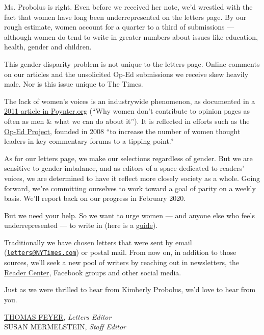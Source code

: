 Ms. Probolus is right. Even before we received her note, we'd wrestled
with the fact that women have long been underrepresented on the letters
page. By our rough estimate, women account for a quarter to a third of
submissions --- although women do tend to write in greater numbers about
issues like education, health, gender and children.

This gender disparity problem is not unique to the letters page. Online
comments on our articles and the unsolicited Op-Ed submissions we
receive skew heavily male. Nor is this issue unique to The Times.

The lack of women's voices is an industrywide phenomenon, as documented
in a
\href{https://www.poynter.org/reporting-editing/2011/why-women-dont-contribute-to-opinion-pages-as-often-as-men-what-we-can-do-about-it/}{2011
article in Poynter.org} (``Why women don't contribute to opinion pages
as often as men \& what we can do about it''). It is reflected in
efforts such as the \href{https://www.theopedproject.org/}{Op-Ed
Project}, founded in 2008 ``to increase the number of women thought
leaders in key commentary forums to a tipping point.''

As for our letters page, we make our selections regardless of gender.
But we are sensitive to gender imbalance, and as editors of a space
dedicated to readers' voices, we are determined to have it reflect more
closely society as a whole. Going forward, we're committing ourselves to
work toward a goal of parity on a weekly basis. We'll report back on our
progress in February 2020.

But we need your help. So we want to urge women --- and anyone else who
feels underrepresented --- to write in (here is a
\href{https://help.nytimes3xbfgragh.onion/hc/en-us/articles/115014925288-How-to-submit-a-letter-to-the-editor}{guide}).

Traditionally we have chosen letters that were sent by email
(\href{mailto:letters@NYTimes.com}{\nolinkurl{letters@NYTimes.com}}) or
postal mail. From now on, in addition to those sources, we'll seek a new
pool of writers by reaching out in newsletters, the
\href{https://www.nytimes3xbfgragh.onion/section/reader-center}{Reader
Center}, Facebook groups and other social media.

Just as we were thrilled to hear from Kimberly Probolus, we'd love to
hear from you.

\href{https://www.nytimes3xbfgragh.onion/2004/05/23/opinion/23READ.html}{THOMAS
FEYER}, \emph{Letters Editor}\\
SUSAN MERMELSTEIN, \emph{Staff Editor}

